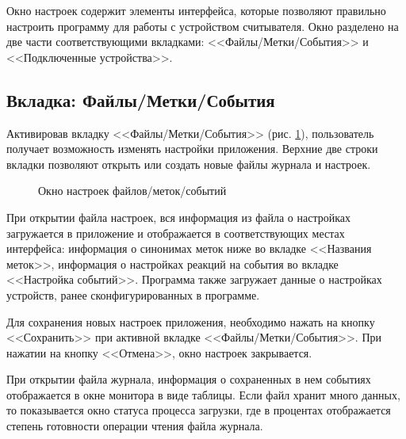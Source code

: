 ﻿Окно настроек содержит элементы интерфейса, которые позволяют правильно настроить программу для
работы с устройством считывателя. Окно разделено на две части соответствующими вкладками: <<Файлы/Метки/События>> и
<<Подключенные устройства>>.

\subsection{Вкладка: Файлы/Метки/События}

Активировав вкладку
<<Файлы/Метки/События>> (рис. \ref{i:stag}), пользователь получает возможность изменять настройки приложения. Верхние две строки вкладки
позволяют открыть или создать новые файлы журнала и настроек. 

\begin{figure}[h]
    \caption{Окно настроек файлов/меток/событий}
    \label{i:stag}
\end{figure}

При открытии файла настроек, вся информация
из файла о настройках загружается в приложение и отображается в соответствующих местах интерфейса: информация о синонимах меток
ниже во вкладке <<Названия меток>>, информация о 
настройках реакций на события во вкладке <<Настройка событий>>. Программа также загружает данные о 
настройках устройств, ранее сконфигурированных в программе.

Для сохранения новых настроек приложения, необходимо нажать на кнопку <<Сохранить>> при активной вкладке
<<Файлы/Метки/События>>. При нажатии на кнопку <<Отмена>>, окно настроек закрывается.

При открытии файла журнала, информация о сохраненных в нем событиях отображается в окне монитора в виде таблицы.
Если файл хранит много данных, то показывается окно статуса процесса загрузки, где в процентах отображается
степень готовности операции чтения файла журнала.  

